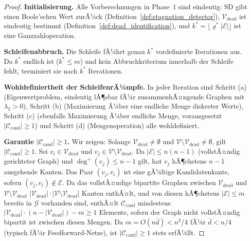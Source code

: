 ﻿\documentclass[12pt, a4paper, openany]{report}
\newcommand{\calG}{\mathcal{G}}
\newcommand{\calV}{\mathcal{V}}
\newcommand{\calE}{\mathcal{E}}
\newcommand{\calC}{\mathcal{C}}
\begin{document}
\begin{proof}
\textbf{Initialisierung.}
Alle Vorberechnungen in Phase~1 sind eindeutig:
$\mathrm{SD}$ gibt einen Boole'schen Wert zurÃ¼ck (Definition~\ref{def:stagnation_detector}),
$\calV_{\mathrm{dead}}$ ist eindeutig bestimmt (Definition~\ref{def:dead_identification}),
und $k^* = \lfloor\varrho^* |\calE|\rfloor$ ist eine Ganzzahloperation.

\textbf{Schleifenabbruch.}
Die Schleife fÃ¼hrt genau $k^*$ vordefinierte Iterationen aus.  Da $k^*$ endlich
ist ($k^* \leq m$) und kein Abbruchkriterium innerhalb der Schleife fehlt,
terminiert sie nach $k^*$ Iterationen.

\textbf{Wohldefiniertheit der SchleifenrÃ¼mpfe.}
In jeder Iteration sind Schritt (a) (Eigenwertproblem, eindeutig lÃ¶sbar
fÃ¼r zusammenhÃ¤ngende Graphen mit $\lambda_2 > 0$), Schritt (b) (Maximierung
Ã¼ber eine endliche Menge diskreter Werte), Schritt (c) (ebenfalls Maximierung
Ã¼ber endliche Menge, vorausgesetzt $|\calC_{\mathrm{cand}}| \geq 1$) und
Schritt (d) (Mengenoperation) alle wohldefiniert.

\textbf{Garantie $|\calC_{\mathrm{cand}}| \geq 1$.}
Wir zeigen: Solange $\calV_{\mathrm{dead}} \neq \emptyset$ und
$\calV \setminus \calV_{\mathrm{dead}} \neq \emptyset$, gilt
$|\calC_{\mathrm{cand}}| \geq 1$.
Sei $v_i \in \calV_{\mathrm{dead}}$ und $v_j \in \calV \setminus \calV_{\mathrm{dead}}$.
Da $|\calE| \leq n(n-1)$ (vollstÃ¤ndig gerichteter Graph) und
$\deg^+(v_j) \leq n - 1$ gilt, hat $v_j$ hÃ¶chstens $n-1$ ausgehende
Kanten.  Das Paar $(v_j, v_i)$ ist eine gÃ¼ltige Kandidatenkante,
sofern $(v_j, v_i) \notin \calE$.  Da das vollstÃ¤ndige bipartite Graphen
zwischen $\calV_{\mathrm{dead}}$ und $\calV \setminus \calV_{\mathrm{dead}}$
$|\calV_{\mathrm{dead}}| \cdot |\calV \setminus \calV_{\mathrm{dead}}|$
Kanten enthÃ¤lt, und von diesen hÃ¶chstens $|\calE| \leq m$ bereits in $\calG$
vorhanden sind, enthÃ¤lt $\calC_{\mathrm{cand}}$ mindestens
$|\calV_{\mathrm{dead}}| \cdot (n - |\calV_{\mathrm{dead}}|) - m \geq 1$ Elemente,
sofern der Graph nicht vollstÃ¤ndig bipartit ist zwischen diesen Mengen.
Da $m = O(n \bar{d}) < n^2/4$ fÃ¼r $\bar{d} < n/4$ (typisch fÃ¼r
Feedforward-Netze), ist $|\calC_{\mathrm{cand}}| \geq 1$ stets erfÃ¼llt.
\end{proof}
\end{document}
